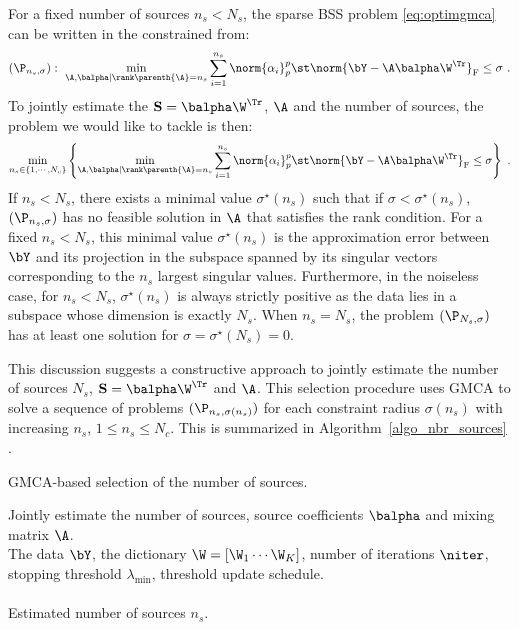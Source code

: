For a fixed number of sources $n_s < N_s$, the sparse BSS problem \eqref{eq:optimgmca} can be written in the constrained from:
\begin{equation}
\label{eq:nbs_pb}
(\P_{n_s,\sigma}): ~ \min_{{\A},\balpha | \rank\parenth{\A} = n_s} \sum_{i=1}^{n_s}\norm{\alpha_i}_{p}^p \st \norm{{\bY} - {\A\balpha\W^\Tr}}_\mathrm{F} \leq \sigma ~ .
\end{equation}
To jointly estimate the ${\bf S} = \balpha \W^\Tr$, $\A$ and the number of sources, the problem we would like to tackle is then:
\begin{equation*}
\label{eq:nbs_pb_all}
\min_{n_s \in \{1,\cdots,N_c\}} \left\{\min_{{\A},\balpha | \rank\parenth{\A} = n_s} \sum_{i=1}^{n_s}\norm{\alpha_i}_{p}^p \st \norm{{\bY} - {\A\balpha\W^\Tr}}_\mathrm{F} \leq \sigma \right\} ~ .
\end{equation*}
If $n_s < N_s$, there exists a minimal value $\sigma^\star(n_s)$ such that if $\sigma < \sigma^\star(n_s)$, $(\P_{n_s,\sigma})$ has no feasible solution in $\A$ that satisfies the rank condition. For a fixed $n_s < N_s$, this minimal value $\sigma^\star(n_s)$ is the approximation error between $\bY$ and its projection in the subspace spanned by its singular vectors corresponding to the $n_s$ largest singular values. Furthermore, in the noiseless case, for $n_s < N_s$, $\sigma^\star(n_s)$ is always strictly positive as the data lies in a subspace whose dimension is exactly $N_s$. When $n_s = N_s$, the problem $(\P_{N_s,\sigma})$ has at least one solution for $\sigma = \sigma^\star(N_s) = 0$. 

This discussion suggests a constructive approach to jointly estimate the number of sources $N_s$, ${\bf S} = \balpha \W^\Tr$ and $\A$. This selection procedure uses GMCA to solve a sequence of problems $(\P_{n_s,\sigma(n_s)})$ for each constraint radius $\sigma(n_s)$ with increasing $n_s$, $1 \leq n_s \leq N_c$. This is summarized in Algorithm~\ref{algo_nbr_sources} \citep{bobin08_aiep}.

{\linespread{1}
\begin{algorithm}[htb]
\caption{GMCA-based selection of the number of sources.}
\label{algo_nbr_sources}
 Jointly estimate the number of sources, source coefficients $\balpha$ and mixing matrix $\A$.\\
 The data $\bY$, the dictionary $\W=[\W_1 \cdots \W_K]$, number of iterations $\niter$, stopping threshold $\lambda_{\min}$, threshold update schedule.\\
\\ 
 Estimated number of sources $n_s$.
\end{algorithm}
}

